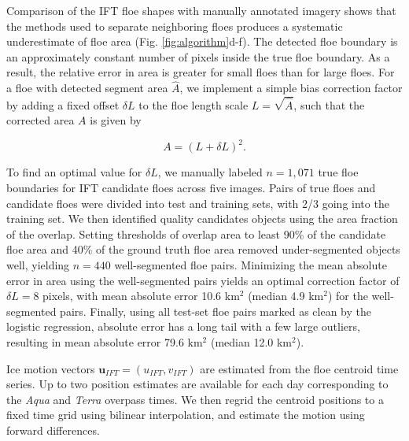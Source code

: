 \documentclass[aog]{igs}
\begin{document}
Comparison of the IFT floe shapes with manually annotated imagery shows that the methods used to separate neighboring floes produces a systematic underestimate of floe area (Fig. \ref{fig:algorithm}d-f). The detected floe boundary is an approximately constant number of pixels inside the true floe boundary. As a result, the relative error in area is greater for small floes than for large floes. For a floe with detected segment area $\hat A$, we implement a simple bias correction factor by adding a fixed offset $\delta L$ to the floe length scale $L = \sqrt{\hat A}$, such that the corrected area $A$ is given by
\begin{linenomath*}
\begin{equation}
    A = (L + \delta L)^2. \label{eqn:area_adj}
\end{equation}
\end{linenomath*}
To find an optimal value for $\delta L$, we manually labeled $n=1,071$ true floe boundaries for IFT candidate floes across five images. Pairs of true floes and candidate floes were divided into test and training sets, with 2/3 going into the training set. We then identified quality candidates objects using the area fraction of the overlap. Setting thresholds of overlap area to least 90\% of the candidate floe area and 40\% of the ground truth floe area removed under-segmented objects well, yielding $n=440$ well-segmented floe pairs. Minimizing the mean absolute error in area using the well-segmented pairs yields an optimal correction factor of $\delta L = 8$ pixels, with mean absolute error 10.6 km$^2$ (median 4.9 km$^2$) for the well-segmented pairs. Finally, using all test-set floe pairs marked as clean by the logistic regression, absolute error has a long tail with a few large outliers, resulting in mean absolute error 79.6 km$^2$ (median 12.0 km$^2$).

Ice motion vectors $\mathbf{u}_{IFT} = (u_{IFT}, v_{IFT})$ are estimated from the floe centroid time series. Up to two position estimates are available for each day corresponding to the \textit{Aqua} and \textit{Terra} overpass times. We then regrid the centroid positions to a fixed time grid using bilinear interpolation, and estimate the motion using forward differences.
\end{document}
